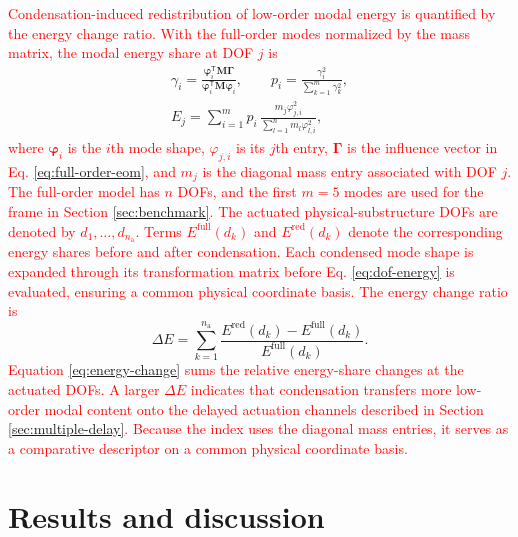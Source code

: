 \documentclass[11pt,a4paper]{article}
\numberwithin{equation}{section}
\newcommand{\rev}[1]{\textcolor{red}{#1}}
\begin{document}
\rev{Condensation-induced redistribution of low-order modal energy is quantified by the energy change ratio. With the full-order modes normalized by the mass matrix, the modal energy share at DOF \(j\) is}
\begin{equation}
	\begin{gathered}
		\gamma_{i}=
		\frac{\bm{\varphi}_{i}^{\mathsf{T}}\mathbf{M}\bm{\Gamma}}
		{\bm{\varphi}_{i}^{\mathsf{T}}\mathbf{M}\bm{\varphi}_{i}},
		\qquad
		p_{i}=\frac{\gamma_{i}^{2}}{\displaystyle\sum_{k=1}^{m}\gamma_{k}^{2}},\\[2pt]
		E_{j}=\sum_{i=1}^{m}p_{i}\,
		\frac{m_{j}\varphi_{j,i}^{2}}{\displaystyle\sum_{l=1}^{n}m_{l}\varphi_{l,i}^{2}},
	\end{gathered}
	\label{eq:dof-energy}
\end{equation}
\rev{where \(\bm{\varphi}_{i}\) is the \(i\)th mode shape, \(\varphi_{j,i}\) is its \(j\)th entry, \(\bm{\Gamma}\) is the influence vector in Eq. \eqref{eq:full-order-eom}, and \(m_{j}\) is the diagonal mass entry associated with DOF \(j\). The full-order model has \(n\) DOFs, and the first \(m=5\) modes are used for the frame in Section \ref{sec:benchmark}. The actuated physical-substructure DOFs are denoted by \(d_{1},\dots,d_{n_{\mathrm{a}}}\). Terms \(E^{\mathrm{full}}(d_{k})\) and \(E^{\mathrm{red}}(d_{k})\) denote the corresponding energy shares before and after condensation. Each condensed mode shape is expanded through its transformation matrix before Eq. \eqref{eq:dof-energy} is evaluated, ensuring a common physical coordinate basis. The energy change ratio is}
\begin{equation}
	\Delta E=\sum_{k=1}^{n_{\mathrm{a}}}
	\frac{E^{\mathrm{red}}(d_{k})-E^{\mathrm{full}}(d_{k})}{E^{\mathrm{full}}(d_{k})}.
	\label{eq:energy-change}
\end{equation}
\rev{Equation \eqref{eq:energy-change} sums the relative energy-share changes at the actuated DOFs. A larger \(\Delta E\) indicates that condensation transfers more low-order modal content onto the delayed actuation channels described in Section \ref{sec:multiple-delay}. Because the index uses the diagonal mass entries, it serves as a comparative descriptor on a common physical coordinate basis.}





\section{Results and discussion} \label{sec5}
\end{document}
